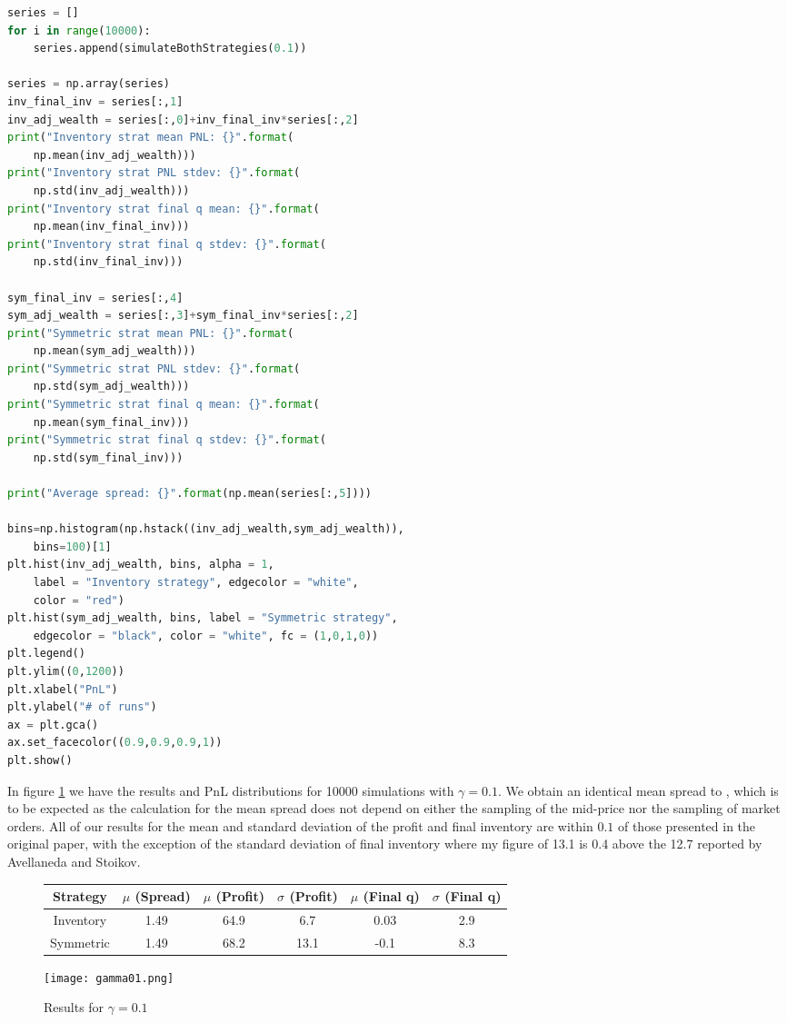 \begin{lstlisting}[language=Python, caption=run-simulations]
series = []
for i in range(10000):
    series.append(simulateBothStrategies(0.1))

series = np.array(series)
inv_final_inv = series[:,1]
inv_adj_wealth = series[:,0]+inv_final_inv*series[:,2]
print("Inventory strat mean PNL: {}".format(
    np.mean(inv_adj_wealth)))
print("Inventory strat PNL stdev: {}".format(
    np.std(inv_adj_wealth)))
print("Inventory strat final q mean: {}".format(
    np.mean(inv_final_inv)))
print("Inventory strat final q stdev: {}".format(
    np.std(inv_final_inv)))

sym_final_inv = series[:,4]
sym_adj_wealth = series[:,3]+sym_final_inv*series[:,2]
print("Symmetric strat mean PNL: {}".format(
    np.mean(sym_adj_wealth)))
print("Symmetric strat PNL stdev: {}".format(
    np.std(sym_adj_wealth)))
print("Symmetric strat final q mean: {}".format(
    np.mean(sym_final_inv)))
print("Symmetric strat final q stdev: {}".format(
    np.std(sym_final_inv)))

print("Average spread: {}".format(np.mean(series[:,5])))

bins=np.histogram(np.hstack((inv_adj_wealth,sym_adj_wealth)), 
    bins=100)[1] 
plt.hist(inv_adj_wealth, bins, alpha = 1, 
    label = "Inventory strategy", edgecolor = "white", 
    color = "red")
plt.hist(sym_adj_wealth, bins, label = "Symmetric strategy", 
    edgecolor = "black", color = "white", fc = (1,0,1,0))
plt.legend()
plt.ylim((0,1200))
plt.xlabel("PnL")
plt.ylabel("# of runs")
ax = plt.gca()
ax.set_facecolor((0.9,0.9,0.9,1))
plt.show()
\end{lstlisting}

In figure \ref{fig:results-gamma01} we have the results and PnL 
distributions for 10000 simulations with $\gamma=0.1$. We obtain 
an identical mean spread to \cite{AS2008}, which is to be expected
as the calculation for the mean spread does not depend on either 
the sampling of the mid-price nor the sampling of market orders.
All of our results for the mean and standard deviation of the profit
and final inventory are within $0.1$ of those presented in the original
paper, with the exception of the standard deviation of final inventory 
where my figure of 13.1 is 0.4 above the 12.7 reported by Avellaneda
and Stoikov.

\begin{figure}[H]
    \centering
        \begin{tabular}{ c c c c c c } 
            \hline
            Strategy & $\mu$ (Spread) & $\mu$ (Profit) & $\sigma$ (Profit) & $\mu$ (Final q) & $\sigma$ (Final q) \\  
            \hline
            Inventory & 1.49 & 64.9 & 6.7 & 0.03 & 2.9 \\
            Symmetric & 1.49 & 68.2 & 13.1 & -0.1 & 8.3 \\
            \hline
        \end{tabular}
        \texttt{[image: gamma01.png]}
        \caption{Results for $\gamma=0.1$}
        \label{fig:results-gamma01}
\end{figure}

